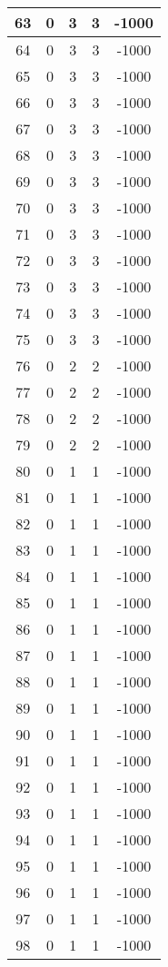 \documentclass[letterpaper, 12pt]{article}
\begin{document}
\begin{longtable}{|c|c|c|c|c|}
\hline
63 & 0 & 3 & 3 & -1000 \\
\hline
64 & 0 & 3 & 3 & -1000 \\
\hline
65 & 0 & 3 & 3 & -1000 \\
\hline
66 & 0 & 3 & 3 & -1000 \\
\hline
67 & 0 & 3 & 3 & -1000 \\
\hline
68 & 0 & 3 & 3 & -1000 \\
\hline
69 & 0 & 3 & 3 & -1000 \\
\hline
70 & 0 & 3 & 3 & -1000 \\
\hline
71 & 0 & 3 & 3 & -1000 \\
\hline
72 & 0 & 3 & 3 & -1000 \\
\hline
73 & 0 & 3 & 3 & -1000 \\
\hline
74 & 0 & 3 & 3 & -1000 \\
\hline
75 & 0 & 3 & 3 & -1000 \\
\hline
76 & 0 & 2 & 2 & -1000 \\
\hline
77 & 0 & 2 & 2 & -1000 \\
\hline
78 & 0 & 2 & 2 & -1000 \\
\hline
79 & 0 & 2 & 2 & -1000 \\
\hline
80 & 0 & 1 & 1 & -1000 \\
\hline
81 & 0 & 1 & 1 & -1000 \\
\hline
82 & 0 & 1 & 1 & -1000 \\
\hline
83 & 0 & 1 & 1 & -1000 \\
\hline
84 & 0 & 1 & 1 & -1000 \\
\hline
85 & 0 & 1 & 1 & -1000 \\
\hline
86 & 0 & 1 & 1 & -1000 \\
\hline
87 & 0 & 1 & 1 & -1000 \\
\hline
88 & 0 & 1 & 1 & -1000 \\
\hline
89 & 0 & 1 & 1 & -1000 \\
\hline
90 & 0 & 1 & 1 & -1000 \\
\hline
91 & 0 & 1 & 1 & -1000 \\
\hline
92 & 0 & 1 & 1 & -1000 \\
\hline
93 & 0 & 1 & 1 & -1000 \\
\hline
94 & 0 & 1 & 1 & -1000 \\
\hline
95 & 0 & 1 & 1 & -1000 \\
\hline
96 & 0 & 1 & 1 & -1000 \\
\hline
97 & 0 & 1 & 1 & -1000 \\
\hline
98 & 0 & 1 & 1 & -1000 \\

\end{longtable}
\end{document}
